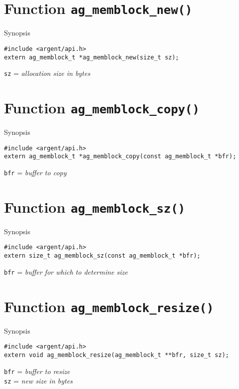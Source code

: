\section{Function \texttt{ag\_memblock\_new()}}
  \begin{bclogo}[logo=\bccrayon, noborder=true, barre=snake, couleurBarre=gray]
    {Synopsis}
  \lstset{style=SYNOPSIS}
  \begin{lstlisting}[linewidth=1.0\linewidth]
#include <argent/api.h>
extern ag_memblock_t *ag_memblock_new(size_t sz);
  \end{lstlisting}
  \scriptsize
  \texttt{sz} = \emph{allocation size in bytes}
  \end{bclogo}

\section{Function \texttt{ag\_memblock\_copy()}}
  \begin{bclogo}[logo=\bccrayon, noborder=true, barre=snake, couleurBarre=gray]
    {Synopsis}
  \lstset{style=SYNOPSIS}
  \begin{lstlisting}[linewidth=1.0\linewidth]
#include <argent/api.h>
extern ag_memblock_t *ag_memblock_copy(const ag_memblock_t *bfr);
  \end{lstlisting}
  \scriptsize
  \texttt{bfr} = \emph{buffer to copy}
  \end{bclogo}

\section{Function \texttt{ag\_memblock\_sz()}}
  \begin{bclogo}[logo=\bccrayon, noborder=true, barre=snake, couleurBarre=gray]
    {Synopsis}
  \lstset{style=SYNOPSIS}
  \begin{lstlisting}[linewidth=1.0\linewidth]
#include <argent/api.h>
extern size_t ag_memblock_sz(const ag_memblock_t *bfr);
  \end{lstlisting}
  \scriptsize
  \texttt{bfr} = \emph{buffer for which to determine size}
  \end{bclogo}

\section{Function \texttt{ag\_memblock\_resize()}}
  \begin{bclogo}[logo=\bccrayon, noborder=true, barre=snake, couleurBarre=gray]
    {Synopsis}
  \lstset{style=SYNOPSIS}
  \begin{lstlisting}[linewidth=1.0\linewidth]
#include <argent/api.h>
extern void ag_memblock_resize(ag_memblock_t **bfr, size_t sz);
  \end{lstlisting}
  \scriptsize
  \texttt{bfr} = \emph{buffer to resize} \\
  \texttt{sz} = \emph{new size in bytes}
  \end{bclogo}

